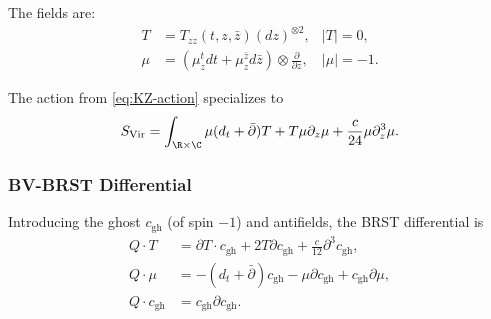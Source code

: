 The fields are:
\begin{align}
T &= T_{zz}(t,z,\bar{z}) (dz)^{\otimes 2}, & |T| = 0,\\
\mu &= (\mu^t_z dt + \mu^{\bar{z}}_z d\bar{z}) \otimes \frac{\partial}{\partial z}, & |\mu| = -1.
\end{align}

The action from \eqref{eq:KZ-action} specializes to
\begin{equation}
S_{\text{Vir}} = \int_{\R \times \C} \mu (d_t + \bar{\partial})T + T \mu \partial_z \mu + \frac{c}{24} \mu \partial_z^3 \mu.
\end{equation}

\subsubsection{BV-BRST Differential}

Introducing the ghost $c_{\mathrm{gh}}$ (of spin $-1$) and antifields, the BRST differential is
\begin{align}
Q \cdot T &= \partial T \cdot c_{\mathrm{gh}} + 2T \partial c_{\mathrm{gh}} + \frac{c}{12} \partial^3 c_{\mathrm{gh}},\\
Q \cdot \mu &= -(d_t + \bar{\partial})c_{\mathrm{gh}} - \mu \partial c_{\mathrm{gh}} + c_{\mathrm{gh}} \partial \mu,\\
Q \cdot c_{\mathrm{gh}} &= c_{\mathrm{gh}} \partial c_{\mathrm{gh}}.
\end{align}

